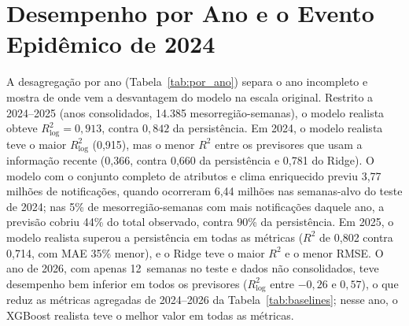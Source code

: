 \section{Desempenho por Ano e o Evento Epidêmico de 2024}
\label{sec:res_2024}

A desagregação por ano (Tabela~\ref{tab:por_ano}) separa o ano incompleto e mostra de onde vem a desvantagem do modelo na escala original. Restrito a 2024--2025 (anos consolidados, 14.385 mesorregião-semanas), o modelo realista obteve $R^2_{\log}=0{,}913$, contra $0{,}842$ da persistência. Em 2024, o modelo realista teve o maior $R^2_{\log}$ (0,915), mas o menor $R^2$ entre os previsores que usam a informação recente (0,366, contra 0,660 da persistência e 0,781 do Ridge). O modelo com o conjunto completo de atributos e clima enriquecido previu 3,77 milhões de notificações, quando ocorreram 6,44 milhões nas semanas-alvo do teste de 2024; nas 5\% de mesorregião-semanas com mais notificações daquele ano, a previsão cobriu 44\% do total observado, contra 90\% da persistência. Em 2025, o modelo realista superou a persistência em todas as métricas ($R^2$ de 0,802 contra 0,714, com MAE 35\% menor), e o Ridge teve o maior $R^2$ e o menor RMSE. O ano de 2026, com apenas 12~semanas no teste e dados não consolidados, teve desempenho bem inferior em todos os previsores ($R^2_{\log}$ entre $-0{,}26$ e $0{,}57$), o que reduz as métricas agregadas de 2024--2026 da Tabela~\ref{tab:baselines}; nesse ano, o XGBoost realista teve o melhor valor em todas as métricas.

